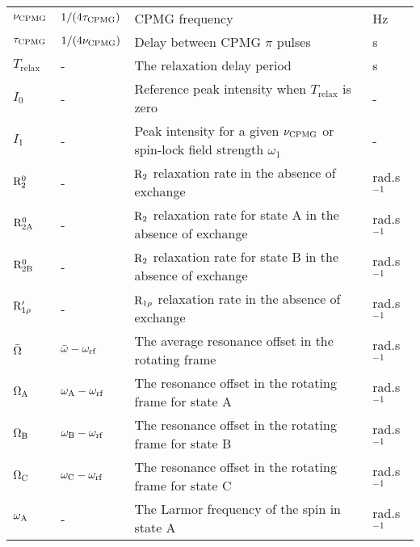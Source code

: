 \begin{landscape}
\begin{center}
\begin{small}
\begin{longtable}{llll}
$\nu_\textrm{CPMG}$          & $1 / (4 \tau_\textrm{CPMG})$             & CPMG frequency                                                                & Hz \\
$\tau_\textrm{CPMG}$         & $1 / (4 \nu_\textrm{CPMG})$              & Delay between CPMG $\pi$ pulses                                               & s \\
$T_\textrm{relax}$ & -                              & The relaxation delay period                                                   & s \\
$I_0$              & -                              & Reference peak intensity when $T_\textrm{relax}$ is zero                      & - \\
$I_1$              & -                              & Peak intensity for a given $\nu_\textrm{CPMG}$ or spin-lock field strength $\omega_1$   & - \\
$\mathrm{R}_2^0$        & -                              & $\mathrm{R}_2$ relaxation rate in the absence of exchange                            & rad.s$^{-1}$ \\
$\mathrm{R}_\mathrm{2A}^0$       & -                              & $\mathrm{R}_2$ relaxation rate for state A in the absence of exchange                & rad.s$^{-1}$ \\
$\mathrm{R}_\mathrm{2B}^0$       & -                              & $\mathrm{R}_2$ relaxation rate for state B in the absence of exchange                & rad.s$^{-1}$ \\
$\mathrm{R}_{1\rho}'$    & -                              & $\mathrm{R}_{1\rho}$ relaxation rate in the absence of exchange                         & rad.s$^{-1}$ \\
$\bar\Omega$       & $\bar\omega - \omega_\textrm{rf}$         & The average resonance offset in the rotating frame                            & rad.s$^{-1}$ \\
$\Omega_\textrm{A}$         & $\omega_\textrm{A} - \omega_\textrm{rf}$           & The resonance offset in the rotating frame for state A                        & rad.s$^{-1}$ \\
$\Omega_\textrm{B}$         & $\omega_\textrm{B} - \omega_\textrm{rf}$           & The resonance offset in the rotating frame for state B                        & rad.s$^{-1}$ \\
$\Omega_\textrm{C}$         & $\omega_\textrm{C} - \omega_\textrm{rf}$           & The resonance offset in the rotating frame for state C                        & rad.s$^{-1}$ \\
$\omega_\textrm{A}$          & -                              & The Larmor frequency of the spin in state A                                   & rad.s$^{-1}$ \\

\end{longtable}
\end{small}
\end{center}
\end{landscape}
